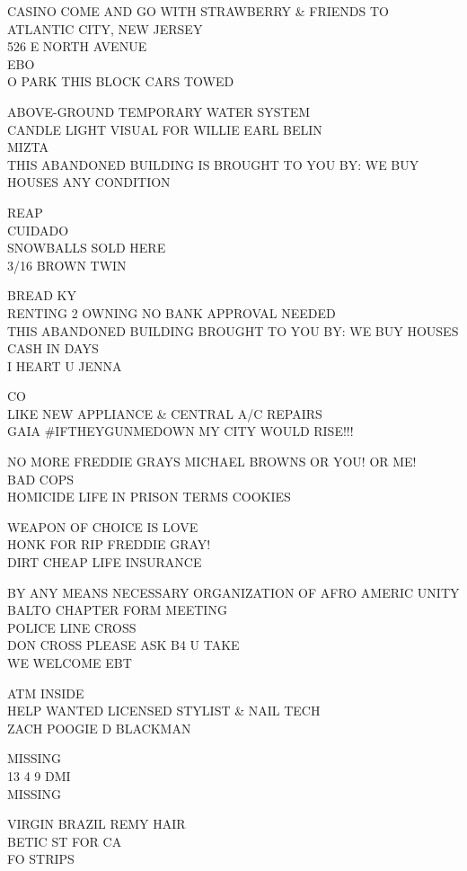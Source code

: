 \documentclass[10pt,letterpaper]{article}
\begin{document}
CASINO COME AND GO WITH STRAWBERRY \& FRIENDS TO ATLANTIC CITY, NEW JERSEY\\
526 E NORTH AVENUE\\
EBO\\
O PARK THIS BLOCK CARS TOWED

ABOVE{-}GROUND TEMPORARY WATER SYSTEM\\
CANDLE LIGHT VISUAL FOR WILLIE EARL BELIN\\
MIZTA\\
THIS ABANDONED BUILDING IS BROUGHT TO YOU BY: WE BUY HOUSES ANY CONDITION

REAP\\
CUIDADO\\
SNOWBALLS SOLD HERE\\
3/16 BROWN TWIN

BREAD KY\\
RENTING 2 OWNING NO BANK APPROVAL NEEDED\\
THIS ABANDONED BUILDING BROUGHT TO YOU BY: WE BUY HOUSES CASH IN DAYS\\
I HEART U JENNA

CO\\
LIKE NEW APPLIANCE \& CENTRAL A/C REPAIRS\\
GAIA \#IFTHEYGUNMEDOWN MY CITY WOULD RISE!!!

NO MORE FREDDIE GRAYS MICHAEL BROWNS OR YOU!  OR ME!\\
BAD COPS\\
HOMICIDE LIFE IN PRISON TERMS COOKIES

WEAPON OF CHOICE IS LOVE\\
HONK FOR RIP FREDDIE GRAY!\\
DIRT CHEAP LIFE INSURANCE

BY ANY MEANS NECESSARY ORGANIZATION OF AFRO AMERIC UNITY BALTO CHAPTER FORM MEETING\\
POLICE LINE CROSS\\
DON CROSS PLEASE ASK B4 U TAKE\\
WE WELCOME EBT

ATM INSIDE\\
HELP WANTED LICENSED STYLIST \& NAIL TECH\\
ZACH POOGIE D BLACKMAN

MISSING\\
13 4 9 DMI\\
MISSING

VIRGIN BRAZIL REMY HAIR\\
BETIC ST FOR CA\\
FO STRIPS
\end{document}
